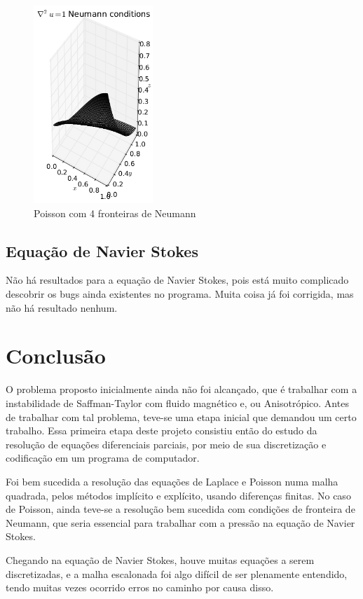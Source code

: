 \documentclass[journal]{IEEEtran}
\begin{document}
\begin{figure}[ht!]
\label{poisson_neumann}
\centering
\includegraphics[width = 0.4\textwidth]{figures/poisson_neumann_01.png}
\caption{Poisson com 4 fronteiras de Neumann}
\end{figure}
\newpage
\subsection{Equação de Navier Stokes}
Não há resultados para a equação de Navier Stokes, pois está muito complicado descobrir os bugs ainda existentes no programa. Muita coisa já foi corrigida, mas não há resultado nenhum.
\section{Conclusão}

O problema proposto inicialmente ainda não foi alcançado, que é trabalhar com a instabilidade de Saffman-Taylor com fluido magnético e, ou Anisotrópico. Antes de trabalhar com tal problema, teve-se uma etapa inicial que demandou um certo trabalho. Essa primeira etapa deste projeto consistiu então do estudo da resolução de equações diferenciais parciais, por meio de sua discretização e codificação em um programa de computador.

Foi bem sucedida a resolução das equações de Laplace e Poisson numa malha quadrada, pelos métodos implícito e explícito, usando diferenças finitas. No caso de Poisson, ainda teve-se a resolução bem sucedida com condições de fronteira de Neumann, que seria essencial para trabalhar com a pressão na equação de Navier Stokes.

Chegando na equação de Navier Stokes, houve muitas equações a serem discretizadas, e a malha escalonada foi algo difícil de ser plenamente entendido, tendo muitas vezes ocorrido erros no caminho por causa disso.
\end{document}
